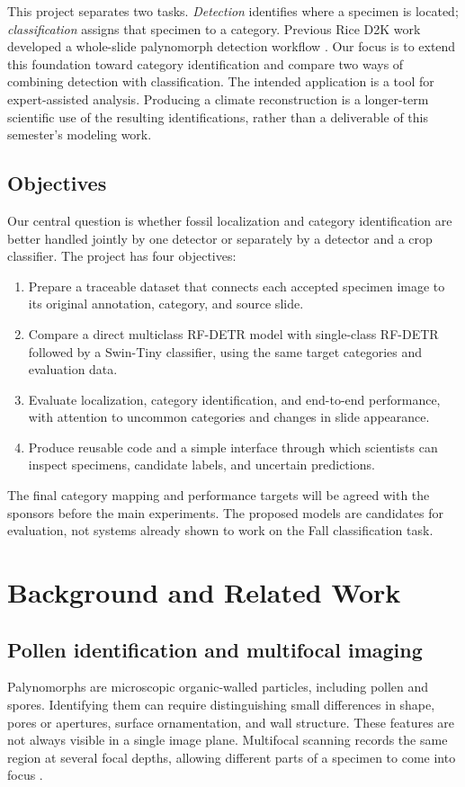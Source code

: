 \documentclass[11pt,letterpaper]{article}
\begin{document}
This project separates two tasks. \emph{Detection} identifies where a specimen is located; \emph{classification} assigns that specimen to a category. Previous Rice D2K work developed a whole-slide palynomorph detection workflow \citep{shaikh2026}. Our focus is to extend this foundation toward category identification and compare two ways of combining detection with classification. The intended application is a tool for expert-assisted analysis. Producing a climate reconstruction is a longer-term scientific use of the resulting identifications, rather than a deliverable of this semester's modeling work.

\subsection{Objectives}
Our central question is whether fossil localization and category identification are better handled jointly by one detector or separately by a detector and a crop classifier. The project has four objectives:
\begin{enumerate}
\item Prepare a traceable dataset that connects each accepted specimen image to its original annotation, category, and source slide.
\item Compare a direct multiclass RF-DETR model with single-class RF-DETR followed by a Swin-Tiny classifier, using the same target categories and evaluation data.
\item Evaluate localization, category identification, and end-to-end performance, with attention to uncommon categories and changes in slide appearance.
\item Produce reusable code and a simple interface through which scientists can inspect specimens, candidate labels, and uncertain predictions.
\end{enumerate}
The final category mapping and performance targets will be agreed with the sponsors before the main experiments. The proposed models are candidates for evaluation, not systems already shown to work on the Fall classification task.

\section{Background and Related Work}
\subsection{Pollen identification and multifocal imaging}
Palynomorphs are microscopic organic-walled particles, including pollen and spores. Identifying them can require distinguishing small differences in shape, pores or apertures, surface ornamentation, and wall structure. These features are not always visible in a single image plane. Multifocal scanning records the same region at several focal depths, allowing different parts of a specimen to come into focus \citep{shaikh2026,punyasena2022}.
\end{document}
